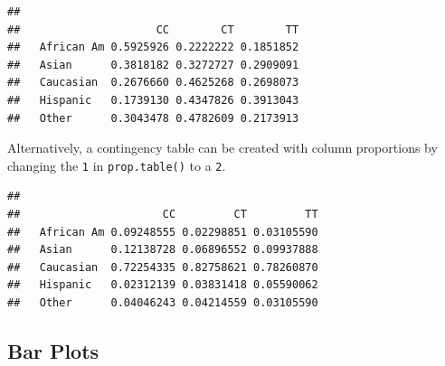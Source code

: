 \begin{knitrout}
\color{fgcolor}\begin{kframe}
\begin{alltt}
 \hlkwb{=} \hlopt{$}\hlopt{$}
 \hlkwb{=}  \hlstd{)}
\end{alltt}
\begin{verbatim}
##             
##                     CC        CT        TT
##   African Am 0.5925926 0.2222222 0.1851852
##   Asian      0.3818182 0.3272727 0.2909091
##   Caucasian  0.2676660 0.4625268 0.2698073
##   Hispanic   0.1739130 0.4347826 0.3913043
##   Other      0.3043478 0.4782609 0.2173913
\end{verbatim}
\end{kframe}
\end{knitrout}

Alternatively, a contingency table can be created with column proportions by changing the \texttt{1} in \texttt{prop.table()} to a \texttt{2}. 

\begin{knitrout}
\color{fgcolor}\begin{kframe}
\begin{alltt}
 \hlkwb{=} \hlopt{$}\hlopt{$}
 \hlkwb{=}  \hlstd{)}
\end{alltt}
\begin{verbatim}
##             
##                      CC         CT         TT
##   African Am 0.09248555 0.02298851 0.03105590
##   Asian      0.12138728 0.06896552 0.09937888
##   Caucasian  0.72254335 0.82758621 0.78260870
##   Hispanic   0.02312139 0.03831418 0.05590062
##   Other      0.04046243 0.04214559 0.03105590
\end{verbatim}
\end{kframe}
\end{knitrout}

\subsection{Bar Plots}

